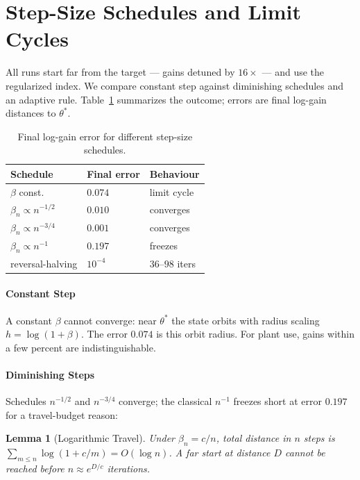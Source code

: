 \documentclass[twocolumn]{ifacconf}
\newtheorem{lemma}{Lemma}
\begin{document}
\section{Step-Size Schedules and Limit Cycles}
\label{sec:schedules}

All runs start far from the target --- gains detuned by $16\times$ --- and use
the regularized index. We compare constant step against diminishing schedules
and an adaptive rule. Table~\ref{tab:schedules} summarizes the outcome; errors
are final log-gain distances to $\theta^*$.

\begin{table}[t]
\small
\centering
\caption{Final log-gain error for different step-size schedules.
}
\label{tab:schedules}
\begin{tabular}{lll}
\toprule
Schedule & Final error & Behaviour \\
\midrule
$\beta$ const.           & $0.074$ & limit cycle \\
$\beta_n \propto n^{-1/2}$ & $0.010$ & converges \\
$\beta_n \propto n^{-3/4}$ & $0.001$ & converges \\
$\beta_n \propto n^{-1}$   & $0.197$ & freezes \\
reversal-halving         & $10^{-4}$ & $36$--$98$ iters \\
\bottomrule
\end{tabular}
\end{table}

\paragraph{Constant Step} A constant $\beta$ cannot converge: near $\theta^*$ the
state orbits with radius scaling $h = \log(1+\beta)$. The error $0.074$ is this
orbit radius. For plant use, gains within a few percent are indistinguishable.

\paragraph{Diminishing Steps} Schedules $n^{-1/2}$ and $n^{-3/4}$ converge; the
classical $n^{-1}$ freezes short at error $0.197$ for a travel-budget reason:

\begin{lemma}[Logarithmic Travel]
\label{lem:travel}
Under $\beta_n = c/n$, total distance in $n$ steps is $\sum_{m \le n}
\log(1 + c/m) = O(\log n)$. A far start at distance $D$ cannot be reached
before $n \approx e^{D/c}$ iterations.
\end{lemma}
\end{document}
